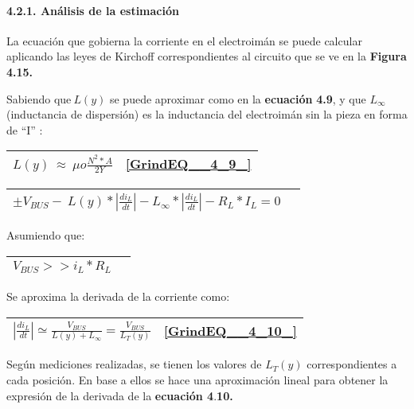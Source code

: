 \noindent 
\paragraph{4.2.1. An\'{a}lisis de la estimaci\'{o}n}

\noindent La ecuaci\'{o}n que gobierna la corriente en el electroim\'{a}n se puede calcular aplicando las leyes de Kirchoff correspondientes al circuito que se ve en la \textbf{Figura 4.15.}


\noindent 

\noindent Sabiendo que$\ L(y)$ se puede aproximar como en la \textbf{ecuaci\'{o}n} \textbf{4.9}, y que $L_{\infty }$(inductancia de dispersi\'{o}n) es la inductancia del electroim\'{a}n sin la pieza en forma de ``I'' :

\noindent 

\begin{tabular}{|p{3.9in}|p{0.4in}|} \hline 
$L(y)\ \approx \ \mu o\frac{N^2*A}{2Y}$ & \eqref{GrindEQ__4_9_}  \\ \hline 
\end{tabular}



\begin{tabular}{|p{3.9in}|p{0.4in}|} \hline 
$\pm V_{BUS}-\ L(y)*\left|\frac{{di}_L}{dt}\right|-L_{\infty }*\left|\frac{{di}_L}{dt}\right|-R_L*I_L=0$ &  \\ \hline 
\end{tabular}



\noindent Asumiendo que:

 

\begin{tabular}{|p{3.9in}|p{0.4in}|} \hline 
$V_{BUS}>>i_L*R_L$ &  \\ \hline 
\end{tabular}



\noindent Se aproxima la derivada de la corriente como:

\noindent 

\begin{tabular}{|p{3.9in}|p{0.4in}|} \hline 
$\left|\frac{{di}_L}{dt}\right|\simeq \frac{V_{BUS}}{L(y)+L_{\infty }}=\frac{V_{BUS}}{L_T(y)}$ & \eqref{GrindEQ__4_10_}  \\ \hline 
\end{tabular}



\noindent Seg\'{u}n mediciones realizadas, se tienen los valores de $L_T(y)$ correspondientes a cada posici\'{o}n. En base a ellos se hace una aproximaci\'{o}n lineal para obtener la expresi\'{o}n de la derivada de la \textbf{ecuaci\'{o}n 4}.\textbf{10.}


